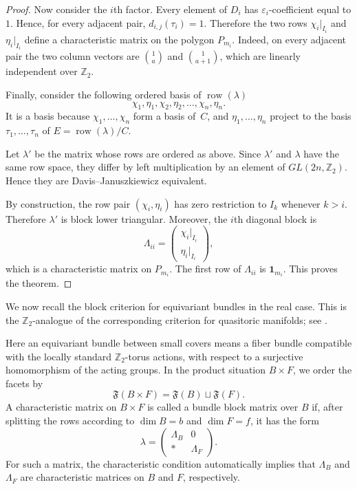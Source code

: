 \documentclass{amsart}
\numberwithin{equation}{section}
\theoremstyle{definition}
\theoremstyle{remark}
\newcommand{\Z}{\mathbb Z}
\newcommand{\fF}{\mathfrak F}
\newcommand{\one}{\mathbf 1}
\DeclareMathOperator{\row}{row}
\begin{document}
\begin{proof}
    Now consider the $i$th factor.
    Every element of $D_i$ has $\varepsilon_i$-coefficient equal to $1$.
    Hence, for every adjacent pair, $d_{i,j}(\tau_i)=1$.
    Therefore the two rows $\chi_i|_{I_i}$ and $\eta_i|_{I_i}$ define a characteristic matrix on the polygon $P_{m_i}$.
    Indeed, on every adjacent pair the two column vectors are $\binom{1}{a}$ and $\binom{1}{a+1}$, which are linearly independent over $\Z_2$.
        
    Finally, consider the following ordered basis of $\row(\lambda)$
    $$
            \chi_1,\eta_1,\chi_2,\eta_2,\ldots,\chi_n,\eta_n.
    $$
    It is a basis because $\chi_1,\ldots,\chi_n$ form a basis of~$C$, and $\eta_1,\ldots,\eta_n$ project to the basis $\tau_1,\ldots,\tau_n$ of $E=\row(\lambda)/C$.
        
    Let $\lambda'$ be the matrix whose rows are ordered as above.
    Since $\lambda'$ and $\lambda$ have the same row space, they differ by left multiplication by an element of $GL(2n,\Z_2)$.
    Hence they are Davis--Januszkiewicz equivalent.
        
    By construction, the row pair $(\chi_i,\eta_i)$ has zero restriction to $I_k$ whenever $k>i$.
    Therefore $\lambda'$ is block lower triangular.
    Moreover, the $i$th diagonal block is
    $$
        \Lambda_{ii}
        =
        \begin{pmatrix}
        \chi_i|_{I_i}\\
        \eta_i|_{I_i}
        \end{pmatrix},
    $$
    which is a characteristic matrix on $P_{m_i}$.
    The first row of $\Lambda_{ii}$ is $\one_{m_i}$.
    This proves the theorem.
\end{proof}

We now recall the block criterion for equivariant bundles in the real case.
This is the $\Z_2$-analogue of the corresponding criterion for quasitoric manifolds; see \cite[Lemma~3.2]{Choi-Park2016IJM}.

Here an equivariant bundle between small covers means a fiber bundle compatible with the locally standard $\Z_2$-torus actions, with respect to a surjective homomorphism of the acting groups.
In the product situation $B\times F$, we order the facets by
$$
    \fF(B\times F)=\fF(B)\sqcup \fF(F).
$$
A characteristic matrix on $B\times F$ is called a bundle block matrix over $B$ if, after splitting the rows according to $\dim B=b$ and $\dim F=f$, it has the form
$$
    \lambda=\begin{pmatrix} \Lambda_B & 0\\ * & \Lambda_F \end{pmatrix}.
$$
For such a matrix, the characteristic condition automatically implies that $\Lambda_B$ and $\Lambda_F$ are characteristic matrices on $B$ and $F$, respectively.
\end{document}
